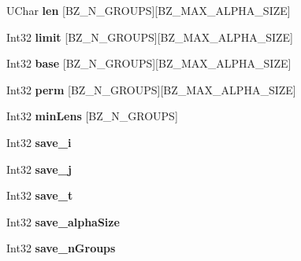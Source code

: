 \begin{DoxyCompactItemize}
\item 
\mbox{\label{struct_d_state_a88edd2962af797d38ea4a3c55be334f0}} 
U\+Char {\bfseries len} \mbox{[}B\+Z\+\_\+\+N\+\_\+\+G\+R\+O\+U\+PS\mbox{]}\mbox{[}B\+Z\+\_\+\+M\+A\+X\+\_\+\+A\+L\+P\+H\+A\+\_\+\+S\+I\+ZE\mbox{]}
\item 
\mbox{\label{struct_d_state_aea1992c1a30e81eaa3ecdde3b3896132}} 
Int32 {\bfseries limit} \mbox{[}B\+Z\+\_\+\+N\+\_\+\+G\+R\+O\+U\+PS\mbox{]}\mbox{[}B\+Z\+\_\+\+M\+A\+X\+\_\+\+A\+L\+P\+H\+A\+\_\+\+S\+I\+ZE\mbox{]}
\item 
\mbox{\label{struct_d_state_a23de4c4eeba321c5ecbcd568be0a9a10}} 
Int32 {\bfseries base} \mbox{[}B\+Z\+\_\+\+N\+\_\+\+G\+R\+O\+U\+PS\mbox{]}\mbox{[}B\+Z\+\_\+\+M\+A\+X\+\_\+\+A\+L\+P\+H\+A\+\_\+\+S\+I\+ZE\mbox{]}
\item 
\mbox{\label{struct_d_state_a82ff7b0baca1439233c657fa0768d551}} 
Int32 {\bfseries perm} \mbox{[}B\+Z\+\_\+\+N\+\_\+\+G\+R\+O\+U\+PS\mbox{]}\mbox{[}B\+Z\+\_\+\+M\+A\+X\+\_\+\+A\+L\+P\+H\+A\+\_\+\+S\+I\+ZE\mbox{]}
\item 
\mbox{\label{struct_d_state_a9944a4ca76768834180a835d97513e93}} 
Int32 {\bfseries min\+Lens} \mbox{[}B\+Z\+\_\+\+N\+\_\+\+G\+R\+O\+U\+PS\mbox{]}
\item 
\mbox{\label{struct_d_state_a627cbd8ee46db9d0f2ebced60295961a}} 
Int32 {\bfseries save\+\_\+i}
\item 
\mbox{\label{struct_d_state_a651a56e1b4d264a3cc948b7a1e95126e}} 
Int32 {\bfseries save\+\_\+j}
\item 
\mbox{\label{struct_d_state_a416a3aa0ff299a33e56624a590bc66ba}} 
Int32 {\bfseries save\+\_\+t}
\item 
\mbox{\label{struct_d_state_a3db63501af7cc7cdd943ccbf1d6cedf4}} 
Int32 {\bfseries save\+\_\+alpha\+Size}
\item 
\mbox{\label{struct_d_state_a72abcd7f412e3b5c4128fb053d7908c7}} 
Int32 {\bfseries save\+\_\+n\+Groups}
\item 

\end{DoxyCompactItemize}

